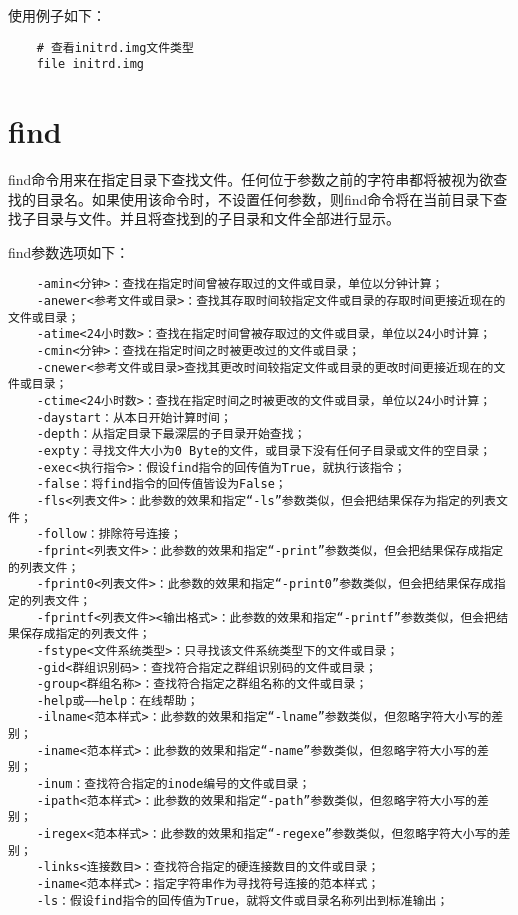 \documentclass[a4paper,left=2.5cm,right=2.5cm,11pt]{article}
\begin{document}
	使用例子如下：
	\begin{lstlisting}
	# 查看initrd.img文件类型
	file initrd.img
	\end{lstlisting}

\section{find}
	find命令用来在指定目录下查找文件。任何位于参数之前的字符串都将被视为欲查找的目录名。如果使用该命令时，不设置任何参数，则find命令将在当前目录下查找子目录与文件。并且将查找到的子目录和文件全部进行显示。\par

	find参数选项如下：
	\begin{lstlisting}
	-amin<分钟>：查找在指定时间曾被存取过的文件或目录，单位以分钟计算； 
	-anewer<参考文件或目录>：查找其存取时间较指定文件或目录的存取时间更接近现在的文件或目录； 
	-atime<24小时数>：查找在指定时间曾被存取过的文件或目录，单位以24小时计算； 
	-cmin<分钟>：查找在指定时间之时被更改过的文件或目录； 
	-cnewer<参考文件或目录>查找其更改时间较指定文件或目录的更改时间更接近现在的文件或目录； 
	-ctime<24小时数>：查找在指定时间之时被更改的文件或目录，单位以24小时计算； 
	-daystart：从本日开始计算时间； 
	-depth：从指定目录下最深层的子目录开始查找； 
	-expty：寻找文件大小为0 Byte的文件，或目录下没有任何子目录或文件的空目录； 
	-exec<执行指令>：假设find指令的回传值为True，就执行该指令； 
	-false：将find指令的回传值皆设为False； 
	-fls<列表文件>：此参数的效果和指定“-ls”参数类似，但会把结果保存为指定的列表文件； 
	-follow：排除符号连接； 
	-fprint<列表文件>：此参数的效果和指定“-print”参数类似，但会把结果保存成指定的列表文件； 
	-fprint0<列表文件>：此参数的效果和指定“-print0”参数类似，但会把结果保存成指定的列表文件； 
	-fprintf<列表文件><输出格式>：此参数的效果和指定“-printf”参数类似，但会把结果保存成指定的列表文件； 
	-fstype<文件系统类型>：只寻找该文件系统类型下的文件或目录； 
	-gid<群组识别码>：查找符合指定之群组识别码的文件或目录； 
	-group<群组名称>：查找符合指定之群组名称的文件或目录； 
	-help或——help：在线帮助； 
	-ilname<范本样式>：此参数的效果和指定“-lname”参数类似，但忽略字符大小写的差别； 
	-iname<范本样式>：此参数的效果和指定“-name”参数类似，但忽略字符大小写的差别； 
	-inum：查找符合指定的inode编号的文件或目录； 
	-ipath<范本样式>：此参数的效果和指定“-path”参数类似，但忽略字符大小写的差别； 
	-iregex<范本样式>：此参数的效果和指定“-regexe”参数类似，但忽略字符大小写的差别； 
	-links<连接数目>：查找符合指定的硬连接数目的文件或目录； 
	-iname<范本样式>：指定字符串作为寻找符号连接的范本样式； 
	-ls：假设find指令的回传值为True，就将文件或目录名称列出到标准输出； 

\end{lstlisting}
\end{document}
